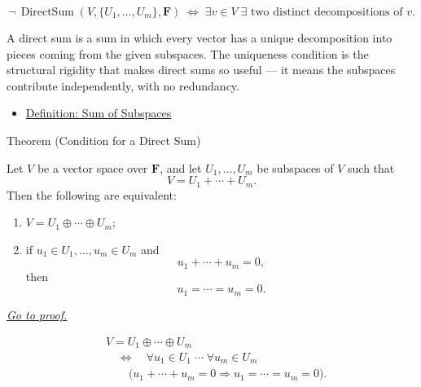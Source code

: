 \begin{remark*}
\[
\neg\,\operatorname{DirectSum}(V,\{U_1,\dots,U_m\},\mathbf{F})
\;\Longleftrightarrow\;
\exists v \in V\;\exists \text{ two distinct decompositions of } v.
\]
\end{remark*}

\begin{remark*}[Interpretation]
A direct sum is a sum in which every vector has a unique decomposition
into pieces coming from the given subspaces. The uniqueness condition is
the structural rigidity that makes direct sums so useful — it means the
subspaces contribute independently, with no redundancy.
\end{remark*}

\begin{remark*}[Dependencies]
\begin{itemize}
  \item \hyperref[def:sum-of-subspaces]{Definition: Sum of Subspaces}
\end{itemize}
\end{remark*}






\begin{theorembox}{Theorem (Condition for a Direct Sum)}
\begin{theorem}
\label{thm:condition-for-direct-sum}
Let $V$ be a vector space over $\mathbf{F}$, and let
$U_1,\dots,U_m$ be subspaces of $V$ such that
\[
V=U_1+\cdots+U_m.
\]
Then the following are equivalent:
\begin{enumerate}[label=(\roman*)]
  \item \(V=U_1\oplus\cdots\oplus U_m\);
  \item if \(u_1 \in U_1,\dots,u_m \in U_m\) and
        \[
        u_1+\cdots+u_m=0,
        \]
        then
        \[
        u_1=\cdots=u_m=0.
        \]
\end{enumerate}
\hyperref[prf:condition-for-direct-sum]{\textit{Go to proof.}}
\end{theorem}
\end{theorembox}

\begin{remark*}
\[
\begin{aligned}
&V=U_1\oplus\cdots\oplus U_m \\
&\quad\Longleftrightarrow\quad
\forall u_1 \in U_1 \;\cdots\; \forall u_m \in U_m \\
&\qquad
\bigl(u_1+\cdots+u_m=0 \Rightarrow u_1=\cdots=u_m=0\bigr).
\end{aligned}
\]
\end{remark*}

